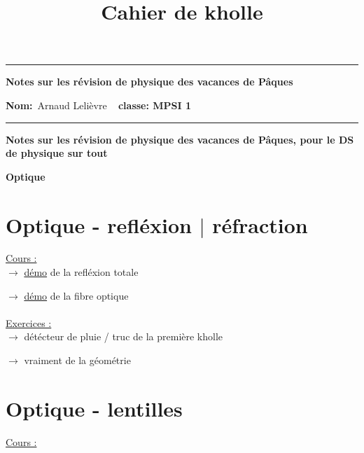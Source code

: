 \documentclass{book}
\title{Cahier de kholle}
\begin{document}
\begin{center}
  \hrule
	\vspace{.4cm}
	{\textbf{\large Notes sur les révision de physique des vacances de Pâques}}
\end{center}

{\textbf{Nom:}\ Arnaud Lelièvre \hspace{\fill} \vspace{0.5cm}}
{\textbf{}\  \hspace{\fill} \vspace{0.5cm}}
{\textbf{classe: MPSI 1}\ \hspace{\fill}}
\hrule
\date{}

\vspace{1cm}

\begin{center}
\textbf{\large Notes sur les révision de physique des vacances de Pâques, pour le DS de physique sur tout}
\end{center}

\vspace{0.6cm}


\begin{center}
\textbf{\large Optique}
\end{center} \vspace{0.2cm}

\section{Optique - refléxion $|$ réfraction}

\underline{\Large{Cours :}} \\

$\rightarrow$ \underline{démo} de la refléxion totale

$\rightarrow$ \underline{démo} de la fibre optique \\ \\
\underline{\Large{Exercices :}} \\

$\rightarrow$ détécteur de pluie / truc de la première kholle

\hspace{1cm}$\rightarrow$ vraiment de la géométrie



\section{Optique - lentilles}

\underline{\Large{Cours :}} \\
\end{document}
